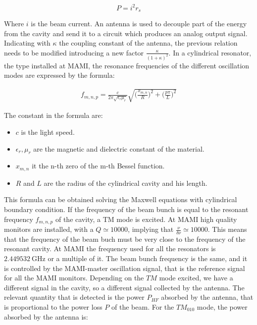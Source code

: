 \begin{equation}
P = i^{2} r_{s}
\end{equation}

Where $i$ is the beam current. An antenna is used to decouple part of the energy from the cavity and send it to a circuit which produces an analog output signal. Indicating with $\kappa$ the coupling constant of the antenna, the previous relation needs to be modified introducing a new factor $ \frac{\kappa}{(1 + \kappa)^2}$. In a cylindrical resonator, the type installed at MAMI, the resonance frequencies of the different oscillation modes are expressed by the formula: 

\begin{align*}
f_{m,n,p} = \frac{c}{2\pi \sqrt{\epsilon_{r} \mu_{r}}} \sqrt{\bigl(\frac{x_{m,n}}{R} \bigl)^{2} + \bigl(\frac{p \pi}{L} \bigl)^{2}}
\end{align*}

The constant in the formula are:

\begin{itemize}
\item $c$ is the light speed.
\item $\epsilon_{r}, \mu_{r}$ are the magnetic and dielectric constant of the material.
\item $x_{m,n}$ it the n-th zero of the m-th Bessel function.
\item $R$ and $L$ are the radius of the cylindrical cavity and his length.
\end{itemize}

This formula can be obtained solving the Maxwell equations with cylindrical boundary condition.
If the frequency of the beam bunch is equal to the resonant frequency $f_{m,n,p}$ of the cavity, a TM mode is excited. At MAMI high quality monitors are installed, with a $Q \simeq 10000$, implying that $\frac{\nu}{\delta \nu} \simeq 10000$. This means that the frequency of the beam buch must be very close to the frequency of the resonant cavity. At MAMI the frequency used for all the resonators is $\SI{2.449532}{\giga \hertz}$ or a multiple of it. The beam bunch frequency is the same, and it is controlled by the MAMI-master oscillation signal, that is the reference signal for all the MAMI monitors.
Depending on the $TM$ mode excited, we have a different signal in the cavity, so a different signal collected by the antenna. The relevant quantity that is detected is the power $P_{HF}$ absorbed by the antenna, that is proportional to the power loss $P$ of the beam. For the $TM_{010}$ mode, the power absorbed by the antenna is: 


